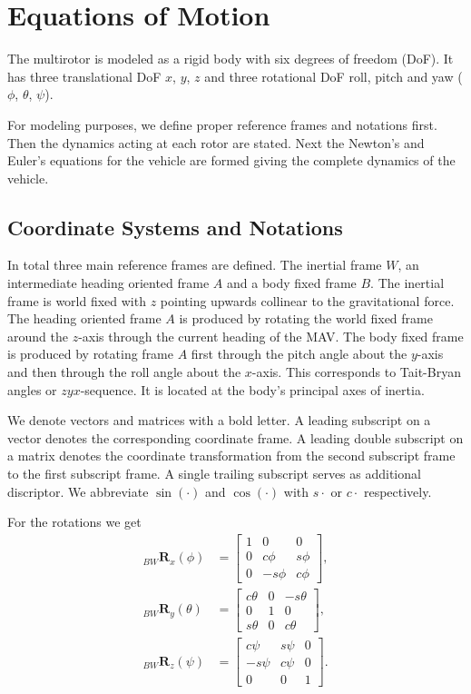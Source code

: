 \section{Equations of Motion}
The multirotor is modeled as a rigid body with six degrees of freedom (DoF). It has three translational DoF $x$, $y$, $z$ and three rotational DoF roll, pitch and yaw ($\phi$, $\theta$, $\psi$).

 For modeling purposes, we define proper reference frames and notations first. Then the dynamics acting at each rotor are stated. Next the Newton's and Euler's equations for the vehicle are formed giving the complete dynamics of the vehicle.

\subsection{Coordinate Systems and Notations}
In total three main reference frames are defined. The inertial frame $W$, an intermediate heading oriented frame $A$ and a body fixed frame $B$. The inertial frame is world fixed with $z$ pointing upwards collinear to the gravitational force. The heading oriented frame $A$ is produced by rotating the world fixed frame around the $z$-axis through the current heading of the MAV. The body fixed frame is produced by rotating frame $A$ first through the pitch angle about the $y$-axis and then through the roll angle about the $x$-axis. This corresponds to Tait-Bryan angles or $zyx$-sequence. It is located at the body's principal axes of inertia.

We denote vectors and matrices with a bold letter. A leading subscript on a vector denotes the corresponding coordinate frame. A leading double subscript on a matrix denotes the coordinate transformation from the second subscript frame to the first subscript frame. A single trailing subscript serves as additional discriptor. We abbreviate $\sin(\cdot)$ and $\cos(\cdot)$ with $s \cdot$ or $c \cdot$ respectively.

For the rotations we get
\begin{align}
_{BW}\mathbf{R}_x (\phi)&=  \begin{bmatrix}
1 & 0 & 0 \\
0 & c\phi & s\phi \\
0 & -s\phi & c\phi
\end{bmatrix} ,\\
_{BW}\mathbf{R}_y (\theta)&=  \begin{bmatrix}
c\theta & 0 & -s\theta \\
0 & 1 & 0 \\
s\theta & 0 & c\theta
\end{bmatrix} ,\\
_{BW}\mathbf{R}_z (\psi)&=  \begin{bmatrix}
c\psi & s\psi & 0 \\
-s\psi & c\psi & 0 \\
0 & 0 &1
\end{bmatrix}.
\end{align}

